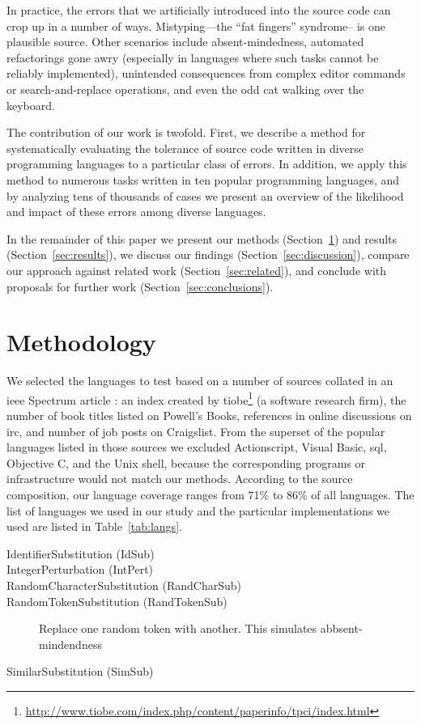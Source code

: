 \documentclass[10pt]{sigplanconf}
\begin{document}
In practice,
the errors that we artificially introduced into the source code can
crop up in a number of ways.
Mistyping---the ``fat fingers'' syndrome-- is one plausible source.
Other scenarios include
absent-mindedness,
automated refactorings gone awry
(especially in languages where such tasks cannot be reliably implemented),
unintended consequences from complex editor commands or
search-and-replace operations,
and even the odd cat walking over the keyboard.

The contribution of our work is twofold.
First, we describe a method for systematically evaluating the tolerance
of source code written in diverse programming languages to a particular
class of errors.
In addition, we apply this method to numerous tasks written in ten popular
programming languages,
and by analyzing tens of thousands of cases we present an overview of
the likelihood and impact of these errors among diverse languages.

In the remainder of this paper we present our
methods (Section~\ref{sec:method}) and
results (Section~\ref{sec:results}),
we discuss our findings (Section~\ref{sec:discussion}),
compare our approach against related work
(Section~\ref{sec:related}),
and conclude with proposals for further work
(Section~\ref{sec:conclusions}).

\section{Methodology} %
\label{sec:method}

We selected the languages to test based on a number of sources
collated in an {\sc ieee} Spectrum article \cite{Kin11}:
an index created by
{\sc tiobe}\footnote{\url{http://www.tiobe.com/index.php/content/paperinfo/tpci/index.html}} (a software research firm),
the number of book titles listed on Powell's Books,
references in online discussions on {\sc irc}, and
number of job posts on Craigslist.
From the superset of the popular languages listed in those
sources we excluded
Actionscript, Visual Basic, {\sc sql}, Objective C, and the Unix shell,
because the corresponding programs or infrastructure would not match our methods.
According to the source composition,
our language coverage ranges from 71\% to 86\% of all languages.
The list of languages we used in our study and the
particular implementations we used are listed in
Table~\ref{tab:langs}.

\begin{description}
	\item [IdentifierSubstitution (IdSub)]
	\item [IntegerPerturbation (IntPert)]
	\item [RandomCharacterSubstitution (RandCharSub)]
	\item [RandomTokenSubstitution (RandTokenSub)] Replace one random token with another. This simulates abbsent-mindendness
	\item [SimilarSubstitution (SimSub)]
\end{description}
\end{document}
